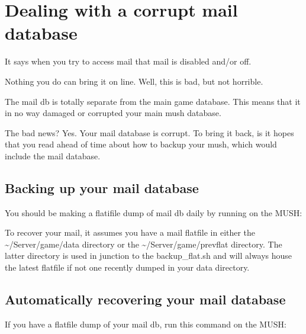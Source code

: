 \documentclass[letterpaper,10pt,english]{sphinxmanual}
\begin{document}
\section{Dealing with a corrupt mail database}
\label{\detokenize{troubleshooting:dealing-with-a-corrupt-mail-database}}
\sphinxAtStartPar
It says when you try to access mail that mail is disabled and/or off.

\sphinxAtStartPar
Nothing you do can bring it on line.  Well, this is bad, but not horrible.

\sphinxAtStartPar
The mail db is totally separate from the main game database.  This means
that it in no way damaged or corrupted your main mush database.

\sphinxAtStartPar
The bad news?  Yes.  Your mail database is corrupt.  To bring it back,
is it hopes that you read ahead of time about how to backup your mush,
which would include the mail database.


\subsection{Backing up your mail database}
\label{\detokenize{troubleshooting:backing-up-your-mail-database}}
\sphinxAtStartPar
You should be making a flatifile dump of mail db daily by running on the MUSH:

\begin{sphinxVerbatim}[commandchars=\\\{\}]
\end{sphinxVerbatim}

\sphinxAtStartPar
To recover your mail, it assumes you have a mail flatfile in either the
\textasciitilde{}/Server/game/data directory or the \textasciitilde{}/Server/game/prevflat directory.  The
latter directory is used in junction to the backup\_flat.sh and will always
house the latest flatfile if not one recently dumped in your data directory.


\subsection{Automatically recovering your mail database}
\label{\detokenize{troubleshooting:automatically-recovering-your-mail-database}}
\sphinxAtStartPar
If you have a flatfile dump of your mail db, run this command on the MUSH:

\begin{sphinxVerbatim}[commandchars=\\\{\}]
\end{sphinxVerbatim}
\end{document}
